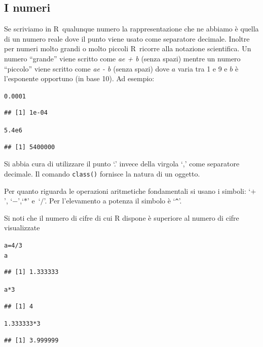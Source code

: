 \documentclass[onecolumn,11pt]{book}\usepackage[]{graphicx}\usepackage[]{color}
\makeatletter
\newcommand{\hlnum}[1]{\textcolor[rgb]{0.686,0.059,0.569}{#1}}%
\newcommand{\hlopt}[1]{\textcolor[rgb]{0,0,0}{#1}}%
\newcommand{\hlstd}[1]{\textcolor[rgb]{0.345,0.345,0.345}{#1}}%
\newcommand{\hlkwb}[1]{\textcolor[rgb]{0.69,0.353,0.396}{#1}}%
\newenvironment{kframe}{%
 \def\at@end@of@kframe{}%
 \ifinner\ifhmode%
  \def\at@end@of@kframe{\end{minipage}}%
  \begin{minipage}{\columnwidth}%
 \fi\fi%
 \def\FrameCommand##1{\hskip\@totalleftmargin \hskip-\fboxsep
 \colorbox{shadecolor}{##1}\hskip-\fboxsep
     \hskip-\linewidth \hskip-\@totalleftmargin \hskip\columnwidth}%
 \MakeFramed {\advance\hsize-\width
   \@totalleftmargin\z@ \linewidth\hsize
   \@setminipage}}%
 {\par\unskip\endMakeFramed%
 \at@end@of@kframe}
\newenvironment{knitrout}{}{} %
\newcommand{\varia}[1]{\textsl{\textsf{#1}}}
\newcommand{\rpr}{\textsf{R}~}
\makeatother
\begin{document}
\subsection{I numeri}
Se scriviamo in \rpr qualunque numero la rappresentazione che ne abbiamo \`e quella di un numero reale dove  il punto viene usato come separatore decimale. Inoltre per numeri molto grandi o molto piccoli \rpr ricorre alla notazione scientifica. Un numero  ``grande''  viene scritto come
\varia{ae + b} (senza spazi) mentre un numero  ``piccolo'' viene scritto come
\varia{ae - b} (senza spazi)
dove $a$ varia tra 1 e 9 e $b$  \`e l'esponente opportuno (in base 10). Ad esempio:
\begin{knitrout}
\color{fgcolor}\begin{kframe}
\begin{alltt}
\hlnum{0.0001}
\end{alltt}
\begin{verbatim}
## [1] 1e-04
\end{verbatim}
\begin{alltt}
\hlnum{5.4e6}
\end{alltt}
\begin{verbatim}
## [1] 5400000
\end{verbatim}
\end{kframe}
\end{knitrout}
Si abbia cura di utilizzare il punto `.' invece della virgola `,'  come separatore decimale.  Il comando \texttt{class()} fornisce la natura di un oggetto.

Per quanto riguarda le operazioni aritmetiche fondamentali si usano i simboli:
`$+$', `$-$',`$*$' e~`$/$'. Per l'elevamento a potenza il simbolo  \`e `\texttt{\^}'.

Si noti  che il numero di cifre di cui \textsf{R} dispone  \`e superiore al numero di cifre visualizzate
\begin{knitrout}
\color{fgcolor}\begin{kframe}
\begin{alltt}
\hlstd{a}\hlkwb{=}\hlnum{4}\hlopt{/}\hlnum{3}
\hlstd{a}
\end{alltt}
\begin{verbatim}
## [1] 1.333333
\end{verbatim}
\begin{alltt}
\hlstd{a}\hlopt{*}\hlnum{3}
\end{alltt}
\begin{verbatim}
## [1] 4
\end{verbatim}
\begin{alltt}
\hlnum{1.333333}\hlopt{*}\hlnum{3}
\end{alltt}
\begin{verbatim}
## [1] 3.999999
\end{verbatim}
\end{kframe}
\end{knitrout}
\end{document}

